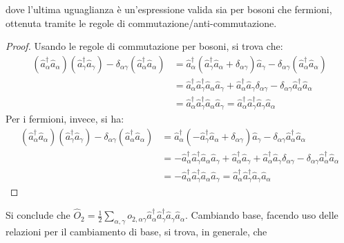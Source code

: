 \documentclass[11pt, a4paper]{scrartcl}
\theoremstyle{style}
\theoremstyle{style1}
\numberwithin{equation}{subsection}
\begin{document}
dove l'ultima uguaglianza \`e un'espressione valida sia per bosoni che fermioni, ottenuta tramite le regole di commutazione/anti-commutazione.
\begin{proof}
	Usando le regole di commutazione per bosoni, si trova che:
\[
\begin{split}
	\left(\hat{a}^\dagger _\alpha \hat{a}_\alpha \right) \left(\hat{a}^\dagger _\gamma \hat{a}_\gamma\right) - \delta _{\alpha \gamma} \left(\hat{a}^\dagger _\alpha \hat{a}_\alpha \right) & = \hat{a}^\dagger _\alpha  \left(\hat{a}^\dagger _\gamma \hat{a}_\alpha  + \delta _{\alpha \gamma} \right) \hat{a}_\gamma- \delta _{\alpha \gamma} \left(\hat{a}^\dagger _\alpha \hat{a}_\alpha \right) \\
																								&= \hat{a}^\dagger _\alpha \hat{a}^\dagger _\gamma \hat{a}_\alpha  \hat{a}_\gamma + \hat{a}_\alpha ^\dagger \hat{a}_\gamma\delta _{\alpha \gamma} - \delta _{\alpha \gamma} \hat{a}^\dagger _\alpha \hat{a}_\alpha \\
		        &=\hat{a}^\dagger _\alpha  \hat{a}^\dagger _\gamma \hat{a}_\alpha  \hat{a}_\gamma = \hat{a}^\dagger _\alpha  \hat{a}^\dagger _\gamma \hat{a}_\gamma\hat{a}_\alpha  
\end{split}
\] 
Per i fermioni, invece, si ha:
\[
\begin{split}
	\left(\hat{a}^\dagger _\alpha \hat{a}_\alpha \right) \left(\hat{a}^\dagger _\gamma \hat{a}_\gamma\right) - \delta _{\alpha \gamma} \left(\hat{a}^\dagger _\alpha \hat{a}_\alpha \right) & = \hat{a}^\dagger _\alpha \left(-\hat{a}^\dagger _\gamma \hat{a}_\alpha  + \delta _{\alpha \gamma} \right) \hat{a}_\gamma - \delta _{\alpha  \gamma}  \hat{a}^\dagger _\alpha  \hat{a}_\alpha \\
																								&=-\hat{a}^\dagger _\alpha \hat{a}^\dagger _\gamma \hat{a}_\alpha  \hat{a}_\gamma + \hat{a}^\dagger _\alpha  \hat{a}_\gamma + \hat{a}^\dagger _\alpha  \hat{a}_\gamma \delta _{\alpha \gamma} - \delta _{\alpha  \gamma}  \hat{a}^\dagger _\alpha \hat{a}_\alpha \\
																								&= - \hat{a}^\dagger _\alpha  \hat{a}^\dagger _\gamma \hat{a}_\alpha  \hat{a}_\gamma = \hat{a}^\dagger _\alpha  \hat{a}^\dagger _\gamma \hat{a}_\gamma \hat{a}_\alpha  
\end{split}
\] 
\end{proof}
\noindent Si conclude che $\hat{O}_2 = \frac{1}{2}\sum_{\alpha ,\gamma}^{} o_{2,\alpha \gamma} \hat{a}^\dagger _\alpha  \hat{a}^\dagger _\gamma \hat{a}_\gamma \hat{a}_\alpha $.
Cambiando base, facendo uso delle relazioni per il cambiamento di base, si trova, in generale, che 
\end{document}
